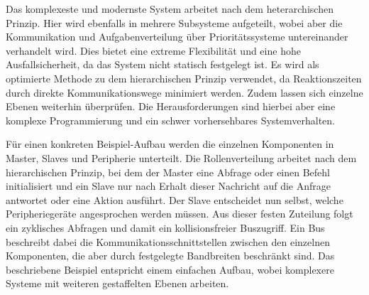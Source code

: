 Das komplexeste und modernste System arbeitet nach dem heterarchischen Prinzip. Hier wird ebenfalls in mehrere Subsysteme aufgeteilt,
wobei aber die Kommunikation und Aufgabenverteilung über Prioritätssysteme untereinander verhandelt wird. Dies bietet eine
extreme Flexibilität und eine hohe Ausfallsicherheit, da das System nicht statisch festgelegt ist. Es wird als optimierte
Methode zu dem hierarchischen Prinzip verwendet, da Reaktionszeiten durch direkte Kommunikationswege minimiert werden. Zudem lassen
sich einzelne Ebenen weiterhin überprüfen. Die Herausforderungen sind hierbei aber eine komplexe Programmierung
und ein schwer vorhersehbares Systemverhalten.

Für einen konkreten Beispiel-Aufbau werden die einzelnen Komponenten in Master, Slaves und Peripherie unterteilt. Die Rollenverteilung
arbeitet nach dem hierarchischen Prinzip, bei dem der Master eine Abfrage oder einen Befehl initialisiert und ein Slave nur nach Erhalt
dieser Nachricht auf die Anfrage antwortet oder eine Aktion ausführt. Der Slave entscheidet nun selbst, welche Peripheriegeräte
angesprochen werden müssen. Aus dieser festen Zuteilung folgt ein zyklisches Abfragen und damit ein kollisionsfreier Buszugriff.
Ein Bus beschreibt dabei die Kommunikationsschnittstellen zwischen den einzelnen Komponenten, die aber durch festgelegte Bandbreiten
beschränkt sind. Das beschriebene Beispiel entspricht einem einfachen Aufbau, wobei komplexere Systeme mit weiteren gestaffelten Ebenen
arbeiten.

